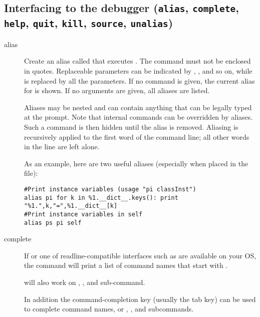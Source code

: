 \subsection{Interfacing to the debugger ({\tt alias}, {\tt complete}, 
{\tt help}, {\tt quit}, {\tt kill}, {\tt source}, {\tt unalias})\label{subsection-misc}}

\begin{description}

\item[alias ]\label{command:aliases}

Create an alias called  that executes .  The
command must not be enclosed in quotes.  Replaceable parameters
can be indicated by , , and so on, while \samp{\%*} is
replaced by all the parameters.  If no command is given, the current
alias for  is shown. If no arguments are given, all
aliases are listed.

Aliases may be nested and can contain anything that can be legally
typed at the  prompt.  Note that internal 
commands can be overridden by aliases.  Such a command is then hidden
until the alias is removed.  Aliasing is recursively applied to the
first word of the command line; all other words in the line are left
alone.

As an example, here are two useful aliases (especially when placed
in the  file):

\begin{verbatim}
#Print instance variables (usage "pi classInst")
alias pi for k in %1.__dict__.keys(): print "%1.",k,"=",%1.__dict__[k]
#Print instance variables in self
alias ps pi self
\end{verbatim}
                
\item[complete ]\label{command:complete}

If
or one of readline-compatible interfaces such as
are available on your OS, the  command will print a
list of command names that start with .

 will also work on , , and
 sub-command. 

In addition the command-completion key (usually the tab key) can be
used to complete command names, or , , and
 subcommands.


\end{description}
